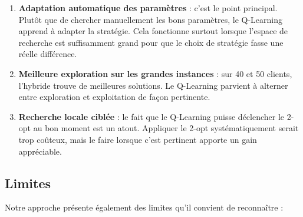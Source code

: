 \documentclass[12pt, a4paper]{article}
\begin{document}
\begin{enumerate}
    \item \textbf{Adaptation automatique des paramètres} : c'est le point principal. Plutôt que de chercher manuellement les bons paramètres, le Q-Learning apprend à adapter la stratégie. Cela fonctionne surtout lorsque l'espace de recherche est suffisamment grand pour que le choix de stratégie fasse une réelle différence.

    \item \textbf{Meilleure exploration sur les grandes instances} : sur 40 et 50 clients, l'hybride trouve de meilleures solutions. Le Q-Learning parvient à alterner entre exploration et exploitation de façon pertinente.

    \item \textbf{Recherche locale ciblée} : le fait que le Q-Learning puisse déclencher le 2-opt au bon moment est un atout. Appliquer le 2-opt systématiquement serait trop coûteux, mais le faire lorsque c'est pertinent apporte un gain appréciable.
\end{enumerate}

\subsection{Limites}

Notre approche présente également des limites qu'il convient de reconnaître :
\end{document}
